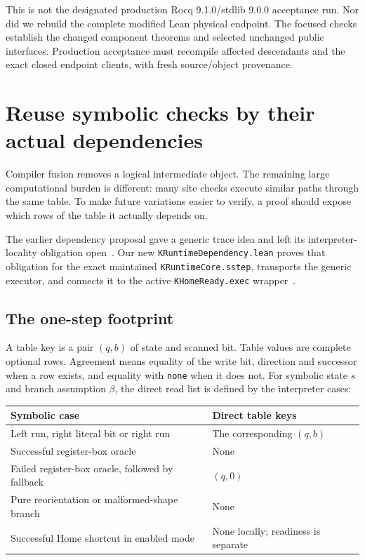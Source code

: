 \documentclass[11pt]{article}
\theoremstyle{definition}\newtheorem{definition}[theorem]{Definition}
\newcommand{\code}[1]{\texttt{#1}}
\begin{document}
This is not the designated production Rocq 9.1.0/stdlib 9.0.0 acceptance run.
Nor did we rebuild the complete modified Lean physical endpoint. The focused
checks establish the changed component theorems and selected unchanged public
interfaces. Production acceptance must recompile affected descendants and
the exact closed endpoint clients, with fresh source/object provenance.

\section{Reuse symbolic checks by their actual dependencies}
\label{sec:reuse}

Compiler fusion removes a logical intermediate object. The remaining large
computational burden is different: many site checks execute similar paths
through the same table. To make future variations easier to verify, a proof
should expose which rows of the table it actually depends on.

The earlier dependency proposal gave a generic trace idea and left its
interpreter-locality obligation open~\cite{priortransport}. Our new
\code{KRuntimeDependency.lean} proves that obligation for the exact maintained
\code{KRuntimeCore.sstep}, transports the generic executor, and connects it to
the active \code{KHomeReady.exec} wrapper~\cite{runtime,home}.

\subsection{The one-step footprint}

A table key is a pair \((q,b)\) of state and scanned bit. Table values are
complete optional rows. Agreement means equality of the write bit, direction
and successor when a row exists, and equality with \code{none} when it does
not. For symbolic state \(s\) and branch assumption \(\beta\), the direct
read list is defined by the interpreter cases:
\begin{center}
\small
\begin{tabularx}{\textwidth}{@{}Xp{}@{}}
\toprule
Symbolic case & Direct table keys\\
\midrule
Left run, right literal bit or right run & The corresponding $(q,b)$\\
Successful register-box oracle & None\\
Failed register-box oracle, followed by fallback & $(q,0)$\\
Pure reorientation or malformed-shape branch & None\\
Successful Home shortcut in enabled mode & None locally; readiness is separate\\
\bottomrule
\end{tabularx}
\end{center}
\end{document}
